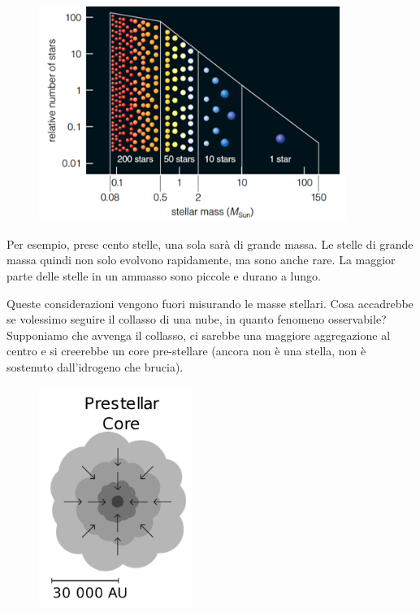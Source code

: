 \begin{figure}[H]
    \centering
    \includegraphics[width=10cm]{lezione 28 novembre/demografiastelle.png}
    \label{lezione 28 novembre/demografiastelle.png}
\end{figure}

Per esempio, prese cento stelle, una sola sarà di grande massa. Le stelle di grande massa quindi non solo evolvono rapidamente, ma sono anche rare. La maggior parte delle stelle in un ammasso sono piccole e durano a lungo.

Queste considerazioni vengono fuori misurando le masse stellari. Cosa accadrebbe se volessimo seguire il collasso di una nube, in quanto fenomeno osservabile? Supponiamo che avvenga il collasso, ci sarebbe una maggiore aggregazione al centro e si creerebbe un core pre-stellare (ancora non è una stella, non è sostenuto dall'idrogeno che brucia).

\begin{figure}[H]
    \centering
    \includegraphics[width=5cm]{lezione 28 novembre/coreprestellare.png}
    \label{lezione 28 novembre/coreprestellare.png}
\end{figure}

